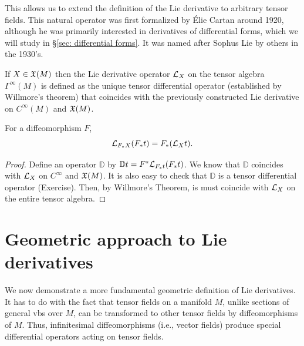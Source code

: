 This allows us to extend the definition of the Lie derivative to arbitrary tensor fields. This natural operator was first formalized by \'Elie Cartan around 1920, although he was primarily interested in derivatives of differential forms, which we will study in \S\ref{sec: differential forms}. It was named after Sophus Lie by others in the 1930's.

\begin{defn}
    If $X\in\mathfrak{X}(M)$ then the Lie derivative operator $\mathcal{L}_X$ on the tensor algebra $\Gamma^\infty(M)$ is defined as the unique tensor differential operator (established by Willmore's theorem) that coincides with the previously constructed Lie derivative on $C^\infty(M)$ and $\mathfrak{X}(M)$.
\end{defn}

\begin{prop}\label{pullbacks of Lie derivatives}
For a diffeomorphism $F$, 
\[\mathcal{L}_{F_\ast X}(F_\ast t)=F_\ast (\mathcal{L}_X t).\]
\end{prop}
\begin{proof}
    Define an operator $\mathbb{D}$ by $\mathbb{D}t=F^\ast \mathcal{L}_{F_\ast t}(F_\ast t)$. We know that $\mathbb{D}$ coincides with $\mathcal{L}_X$ on $C^\infty$ and $\mathfrak{X}(M)$. It is also easy to check that $\mathbb{D}$ is a tensor differential operator (Exercise). Then, by Willmore's Theorem, is must coincide with $\mathcal{L}_X$ on the entire tensor algebra.
\end{proof}





\section{Geometric approach to Lie derivatives}

We now demonstrate a more fundamental geometric definition of Lie derivatives. It has to do with the fact that tensor fields on a manifold $M$, unlike sections of general \glspl{vb} over $M$, can be transformed to other tensor fields by diffeomorphisms of $M$. Thus, infinitesimal diffeomorphisms (i.e., vector fields) produce special differential operators acting on tensor fields.

